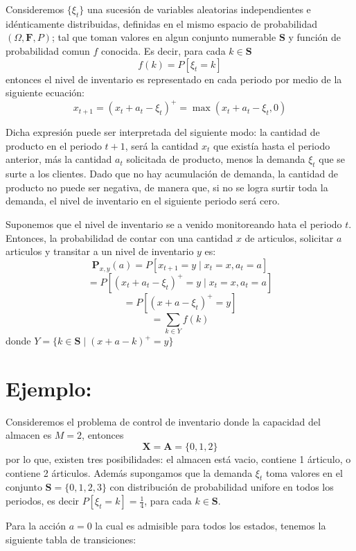 \documentclass[
  us-letterpaper,
  DIV=11,
  numbers=noendperiod]{scrreprt}
\begin{document}
Consideremos \(\{ \xi_t\}\) una sucesión de variables aleatorias
independientes e idénticamente distribuidas, definidas en el mismo
espacio de probabilidad \((\Omega,\mathbf{F},P)\); tal que toman valores
en algun conjunto numerable \(\mathbf{S}\) y función de probabilidad
comun \(f\) conocida. Es decir, para cada \(k\in\mathbf{S}\) \[
f(k)=P[\xi_t=k]
\] entonces el nivel de inventario es representado en cada periodo por
medio de la siguiente ecuación:
\[x_{t+1}=(x_t+a_t-\xi_t)^{+}=\max(x_t+a_t-\xi_t,0)\]

Dicha expresión puede ser interpretada del siguiente modo: la cantidad
de producto en el periodo \(t+1\), será la cantidad \(x_t\) que existía
hasta el periodo anterior, más la cantidad \(a_t\) solicitada de
producto, menos la demanda \(\xi_t\) que se surte a los clientes. Dado
que no hay acumulación de demanda, la cantidad de producto no puede ser
negativa, de manera que, si no se logra surtir toda la demanda, el nivel
de inventario en el siguiente periodo será cero.

Suponemos que el nivel de inventario se a venido monitoreando hata el
periodo \(t\). Entonces, la probabilidad de contar con una cantidad
\(x\) de articulos, solicitar \(a\) articulos y transitar a un nivel de
inventario \(y\) es: \[
\mathbf{P}_{x,y}(a)= P[x_{t+1}=y \mid x_t=x, a_t=a]
\] \[
=P[(x_t+a_t-\xi_t)^{+}=y \mid x_t=x, a_t=a]
\] \[
=P[(x+a-\xi_t)^{+}=y]
\] \[
=\sum_{k\in Y}f(k)
\] donde \(Y=\{k \in \mathbf{S} \mid (x+a-k)^+=y\}\)


\chapter{Ejemplo:}\label{ejemplo}

Consideremos el problema de control de inventario donde la capacidad del
almacen es \(M=2\), entonces \[
\mathbf{X}=\mathbf{A}=\{0,1,2\}
\] por lo que, existen tres posibilidades: el almacen está vacio,
contiene 1 árticulo, o contiene 2 árticulos. Además supongamos que la
demanda \(\xi_t\) toma valores en el conjunto \(\mathbf{S}=\{0,1,2,3\}\)
con distribución de probabilidad unifore en todos los periodos, es decir
\(P[\xi_t=k]=\frac{1}{4}\), para cada \(k\in\mathbf{S}\).

Para la acción \(a=0\) la cual es admisible para todos los estados,
tenemos la siguiente tabla de transiciones:
\end{document}
